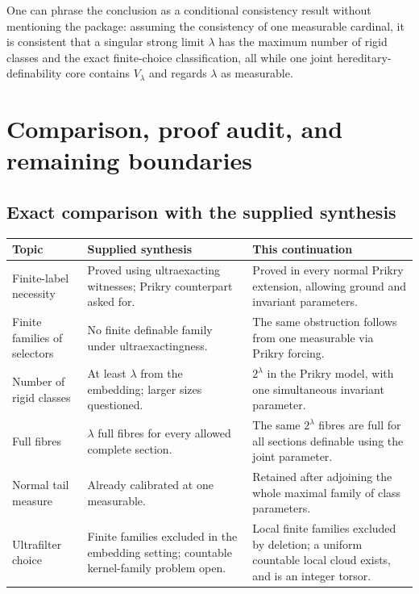 \documentclass[11pt,letterpaper]{article}
\theoremstyle{definition}
\numberwithin{equation}{section}
\begin{document}
One can phrase the conclusion as a conditional consistency result without mentioning the package: assuming the consistency of one measurable cardinal, it is consistent that a singular strong limit $\lambda$ has the maximum number of rigid classes and the exact finite-choice classification, all while one joint hereditary-definability core contains $V_\lambda$ and regards $\lambda$ as measurable.

\section{Comparison, proof audit, and remaining boundaries}\label{sec:audit}

\subsection{Exact comparison with the supplied synthesis}

\begin{center}
\small
\renewcommand{\arraystretch}{1.18}
\begin{tabularx}{\textwidth}{@{}P{.25\textwidth}YY@{}}
\toprule
\textbf{Topic}&\textbf{Supplied synthesis}&\textbf{This continuation}\\
\midrule
Finite-label necessity & Proved using ultraexacting witnesses; Prikry counterpart asked for. & Proved in every normal Prikry extension, allowing ground and invariant parameters.\\
Finite families of selectors & No finite definable family under ultraexactingness. & The same obstruction follows from one measurable via Prikry forcing.\\
Number of rigid classes & At least $\lambda$ from the embedding; larger sizes questioned. & $2^\lambda$ in the Prikry model, with one simultaneous invariant parameter.\\
Full fibres & $\lambda$ full fibres for every allowed complete section. & The same $2^\lambda$ fibres are full for all sections definable using the joint parameter.\\
Normal tail measure & Already calibrated at one measurable. & Retained after adjoining the whole maximal family of class parameters.\\
Ultrafilter choice & Finite families excluded in the embedding setting; countable kernel-family problem open. & Local finite families excluded by deletion; a uniform countable local cloud exists, and is an integer torsor.\\
\bottomrule
\end{tabularx}
\end{center}
\end{document}

